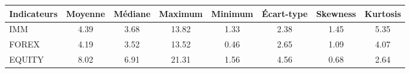 \begin{tabular}{lccccccc}
        \toprule
        \textbf{Indicateurs} & \textbf{Moyenne} & \textbf{Médiane} & \textbf{Maximum} & \textbf{Minimum} & \textbf{Écart-type} & \textbf{Skewness} & \textbf{Kurtosis} \\
        \midrule
        IMM      & 4.39  & 3.68  & 13.82  & 1.33  & 2.38  & 1.45  & 5.35  \\
        FOREX    & 4.19  & 3.52  & 13.52  & 0.46  & 2.65  & 1.09  & 4.07  \\
        EQUITY   & 8.02  & 6.91  & 21.31  & 1.56  & 4.56  & 0.68  & 2.64  \\
        \bottomrule
\end{tabular}


